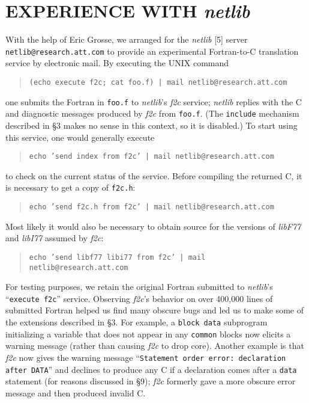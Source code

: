 \documentclass[12pt]{article}
\begin{document}
\section{EXPERIENCE WITH \emph{netlib}}

With the help of Eric Grosse, we arranged for the \emph{netlib} [5] server \texttt{netlib@research.att.com} to provide an experimental Fortran-to-C translation service by electronic mail. By executing the UNIX command
\begin{quote}
\begin{verbatim}
(echo execute f2c; cat foo.f) | mail netlib@research.att.com
\end{verbatim}
\end{quote}
one submits the Fortran in \verb|foo.f| to \emph{netlib}’s \emph{f2c} service; \emph{netlib} replies with the C and diagnostic messages produced by \emph{f2c} from \verb|foo.f|. (The \verb|include| mechanism described in §3 makes no sense in this context, so it is disabled.) To start using this service, one would generally execute
\begin{quote}
\begin{verbatim}
echo ’send index from f2c’ | mail netlib@research.att.com
\end{verbatim}
\end{quote}
to check on the current status of the service. Before compiling the returned C, it is necessary to get a copy of \verb|f2c.h|:
\begin{quote}
\begin{verbatim}
echo ’send f2c.h from f2c’ | mail netlib@research.att.com
\end{verbatim}
\end{quote}
Most likely it would also be necessary to obtain source for the versions of \emph{libF77} and \emph{libI77} assumed by \emph{f2c}:
\begin{quote}
\begin{verbatim}
echo ’send libf77 libi77 from f2c’ | mail netlib@research.att.com
\end{verbatim}
\end{quote}

For testing purposes, we retain the original Fortran submitted to \emph{netlib}’s ``\verb|execute f2c|'' service. Observing \emph{f2c}’s behavior on over 400,000 lines of submitted Fortran helped us find many obscure bugs and led us to make some of the extensions described in §3. For example, a \verb|block data| subprogram initializing a variable that does not appear in any \verb|common| blocks now elicits a warning message (rather than causing \emph{f2c} to drop core). Another example is that \emph{f2c} now gives the warning message ``\texttt{Statement order error: declaration after DATA}'' and declines to produce any C if a declaration comes after a \verb|data| statement (for reasons discussed in §9); \emph{f2c} formerly gave a more obscure error message and then produced invalid C.
\end{document}
